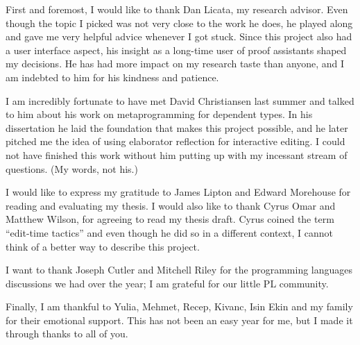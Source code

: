 \documentclass[11pt, ma]{westhesis}
\theoremstyle{plain}
\theoremstyle{definition}
\numberwithin{section}{chapter}
\numberwithin{figure}{chapter}
\begin{document}
\begin{acknowledgements}
First and foremost, I would like to thank Dan Licata, my research advisor.
Even though the topic I picked was not very close to the work he does, he
played along and gave me very helpful advice whenever I got stuck.
Since this project also had a user interface aspect, his insight as a
long-time user of proof assistants shaped my decisions.
He has had more impact on my research taste than anyone, and I am indebted to
him for his kindness and patience.

I am incredibly fortunate to have met David Christiansen last summer and talked
to him about his work on metaprogramming for dependent types.
In his dissertation\cite{davidphd} he laid the foundation that makes this
project possible, and he later pitched me the idea of using elaborator
reflection for interactive editing.
I could not have finished this work without him putting up with my incessant
stream of questions. (My words, not his.)

I would like to express my gratitude to James Lipton and Edward Morehouse for
reading and evaluating my thesis. I would also like to thank Cyrus Omar and
Matthew Wilson, for agreeing to read my thesis draft. Cyrus coined the term
``edit-time tactics'' and even though he did so in a different
context\cite{hazelnut}, I cannot think of a better way to describe this
project.

I want to thank Joseph Cutler and Mitchell Riley for the programming languages
discussions we had over the year; I am grateful for our little PL community.

Finally, I am thankful to Yulia, Mehmet, Recep, Kivanc, Isin Ekin and
my family for their emotional support. This has not been an easy year for me,
but I made it through thanks to all of you.
\end{acknowledgements}

\frontmatter
\maketitle
\makeabstract
\makededication
\makeack

\tableofcontents

\newcommand{\nocontentsline}[3]{}
\bgroup\let\addcontentsline=\nocontentsline
\renewcommand\numberline[1]{#1.\ }
\listoffigures
\egroup

\mainmatter












\end{document}
